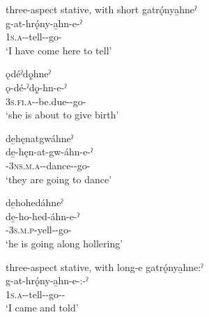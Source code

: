 \ea\label{ex:displurpsufex3} three-aspect stative, with short 
\ea gatrǫ́nya̱hneˀ\\
\gll g-at-hrǫ́ny-a̱hn-e-ˀ\\
 \textsc{1s.a}-{\semireflexive}-tell-{\dislocative}-go-{\stative}\\
\glt `I have come here to tell'

\ex ǫdéˀdǫ̱hneˀ\\
\gll ǫ-dé-ˀdǫ̱-hn-e-ˀ\\
 \textsc{3s.fi.a}-{\semireflexive}-be.due-{\dislocative}-go-{\stative}\\
\glt `she is about to give birth'


\ex de̱hęnatgwáhneˀ\\
\gll de̱-hęn-at-gw-áhn-e-ˀ\\
 {\dualic}-\textsc{3ns.m.a}-{\semireflexive}-dance-{\dislocative}-go-{\stative}\\
\glt `they are going to dance'


\ex de̱hohedáhneˀ\\
\gll de̱-ho-hed-áhn-e-ˀ\\
 {\dualic}-\textsc{3s.m.p}-yell-{\dislocative}-go-{\stative}\\
\glt `he is going along hollering'

\z
\z

\ea\label{ex:displurpsufex4} three-aspect stative, with long-e 
\ea gatrǫ́nya̱hne:ˀ\\
\gll g-at-hrǫ́ny-a̱hn-e-:-ˀ\\
 \textsc{1s.a}-{\semireflexive}-tell-{\dislocative}-go-{\purposive}-{\stative}\\
\glt `I came and told'

